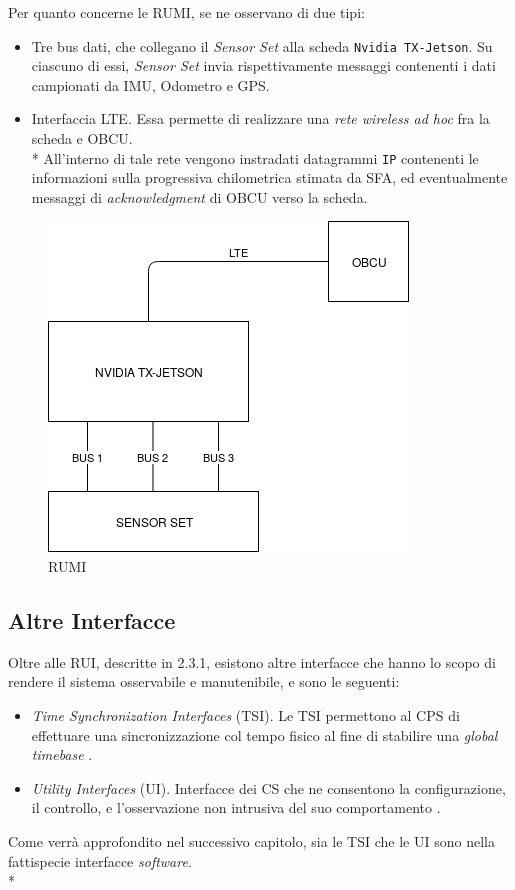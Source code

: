 	Per quanto concerne le RUMI, se ne osservano di due tipi:
	\begin{itemize}
		\item Tre bus dati, che collegano il \emph{Sensor Set} alla scheda \texttt{Nvidia TX-Jetson}. Su ciascuno di essi, \emph{Sensor Set} invia rispettivamente messaggi contenenti i dati campionati da IMU, Odometro e GPS.
		\item Interfaccia LTE. Essa permette di realizzare una \emph{rete wireless ad hoc} fra la scheda e OBCU.\\*
		All'interno di tale rete vengono instradati datagrammi \texttt{IP} contenenti le informazioni sulla progressiva chilometrica stimata da SFA, ed eventualmente messaggi di \emph{acknowledgment} di OBCU verso la scheda.
	\end{itemize}
	\begin{figure}[h]
		\centering
		\includegraphics[width=0.7\linewidth]{img/TrainDiagram}
		\caption{RUMI}
		\label{fig:tdiagram}
	\end{figure}
	\subsection{Altre Interfacce}
	Oltre alle RUI, descritte in 2.3.1, esistono altre interfacce che hanno lo scopo di rendere il sistema osservabile e manutenibile, e sono le seguenti:	\cite{cecca}
	\begin{itemize}
		\item \emph{Time Synchronization Interfaces} (TSI). Le TSI permettono al CPS di effettuare una sincronizzazione col tempo fisico al fine di stabilire una \emph{global timebase} \cite{clock}.
		\item \emph{Utility Interfaces} (UI). Interfacce dei CS che ne consentono la configurazione, il controllo, e l'osservazione non intrusiva del suo comportamento \cite{monitoring}.
	\end{itemize}
	Come verr\`a approfondito nel successivo capitolo, sia le TSI che le UI sono nella fattispecie interfacce \emph{software}.\\*
